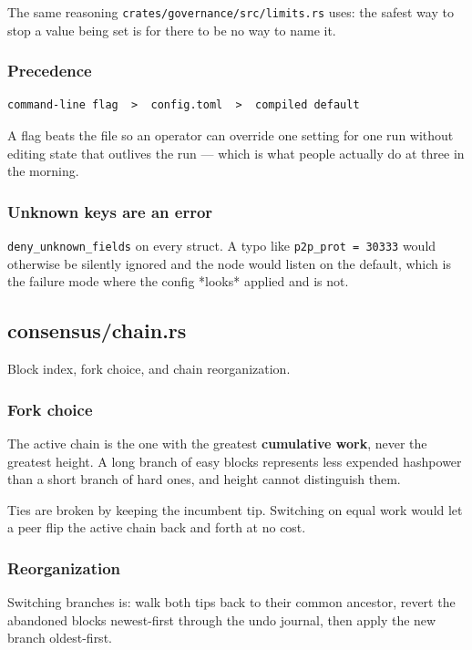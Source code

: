 \documentclass[11pt,a4paper]{article}
\begin{document}
The same reasoning \texttt{crates/governance/src/limits.rs} uses: the safest way to stop a
value being set is for there to be no way to name it.

\subsubsection{Precedence}

\begin{verbatim}
command-line flag  >  config.toml  >  compiled default
\end{verbatim}

A flag beats the file so an operator can override one setting for one run
without editing state that outlives the run — which is what people actually
do at three in the morning.

\subsubsection{Unknown keys are an error}

\texttt{deny\_unknown\_fields} on every struct. A typo like \texttt{p2p\_prot = 30333} would
otherwise be silently ignored and the node would listen on the default,
which is the failure mode where the config *looks* applied and is not.

\subsection{consensus/chain.rs}
Block index, fork choice, and chain reorganization.

\subsubsection{Fork choice}

The active chain is the one with the greatest \textbf{cumulative work}, never the
greatest height. A long branch of easy blocks represents less expended
hashpower than a short branch of hard ones, and height cannot distinguish
them.

Ties are broken by keeping the incumbent tip. Switching on equal work would
let a peer flip the active chain back and forth at no cost.

\subsubsection{Reorganization}

Switching branches is: walk both tips back to their common ancestor, revert
the abandoned blocks newest-first through the undo journal, then apply the
new branch oldest-first.
\end{document}
